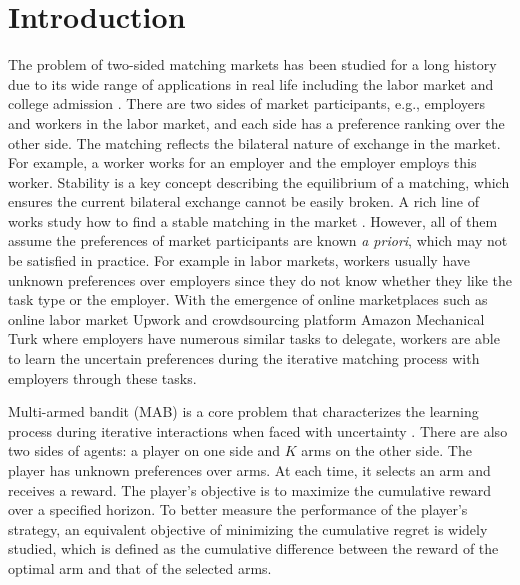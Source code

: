 \section{Introduction}\label{sec:intro}

The problem of two-sided matching markets has been studied for a long history due to its wide range of applications in real life including the labor market and college admission \citep{gale1962college,roth1984evolution,roth1992two,abdulkadirouglu1999house,epple2006admission,fu2014equilibrium}. 
There are two sides of market participants, e.g., employers and workers in the labor market, and each side has a preference ranking over the other side. 
The matching reflects the bilateral nature of exchange in the market. For example, a worker works for an employer and the employer employs this worker.  
Stability is a key concept describing the equilibrium of a matching, which ensures the current bilateral exchange cannot be easily broken.  
A rich line of works study how to find a stable matching in the market \citep{gale1962college,kelso1982job,roth1984evolution,roth1992two,erdil2019efficiency}.
However, all of them assume the preferences of market participants are known \emph{a priori}, which may not be satisfied in practice. 
For example in labor markets, workers usually have unknown preferences over employers since they do not know whether they like the task type or the employer. 
With the emergence of online marketplaces such as online labor market Upwork and crowdsourcing platform Amazon Mechanical Turk where employers have numerous similar tasks to delegate, workers are able to learn the uncertain preferences during the iterative matching process with employers through these tasks. 



Multi-armed bandit (MAB) is a core problem that characterizes the learning process during iterative interactions when faced with uncertainty  \citep{lattimore2020bandit}. 
There are also two sides of agents: a player on one side and $K$ arms on the other side. The player has unknown preferences over arms. At each time, it selects an arm and receives a reward. 
The player's objective is to maximize the cumulative reward over a specified horizon. 
To better measure the performance of the player's strategy, an equivalent objective of minimizing the cumulative regret is widely studied, which is defined as the cumulative difference between the reward of the optimal arm and that of the selected arms.  




